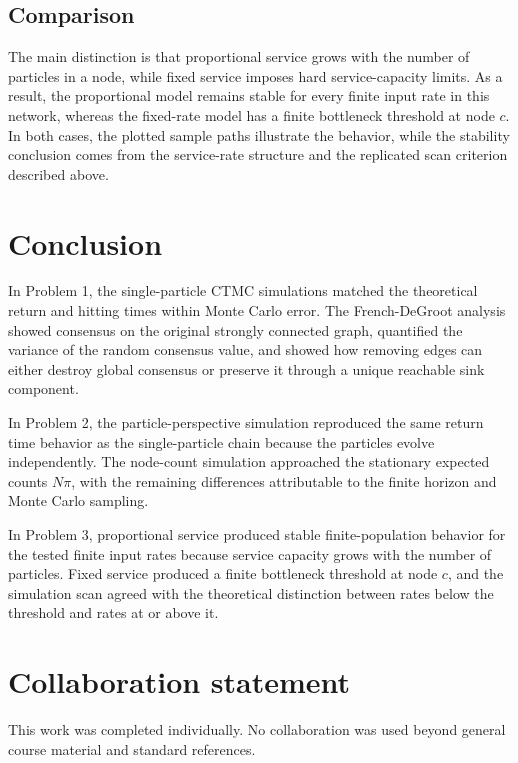 \documentclass[11pt]{article}
\begin{document}
\subsection*{Comparison}

The main distinction is that proportional service grows with the number of
particles in a node, while fixed service imposes hard service-capacity limits.
As a result, the proportional model remains stable for every finite input rate
in this network, whereas the fixed-rate model has a finite bottleneck
threshold at node $c$. In both cases, the plotted sample paths illustrate the
behavior, while the stability conclusion comes from the service-rate structure
and the replicated scan criterion described above.

\section{Conclusion}

In Problem 1, the single-particle CTMC simulations matched the theoretical
return and hitting times within Monte Carlo error. The French-DeGroot analysis
showed consensus on the original strongly connected graph, quantified the
variance of the random consensus value, and showed how removing edges can
either destroy global consensus or preserve it through a unique reachable sink
component.

In Problem 2, the particle-perspective simulation reproduced the same return
time behavior as the single-particle chain because the particles evolve
independently. The node-count simulation approached the stationary expected
counts $N\pi$, with the remaining differences attributable to the finite
horizon and Monte Carlo sampling.

In Problem 3, proportional service produced stable finite-population behavior
for the tested finite input rates because service capacity grows with the
number of particles. Fixed service produced a finite bottleneck threshold at
node $c$, and the simulation scan agreed with the theoretical distinction
between rates below the threshold and rates at or above it.

\section{Collaboration statement}

This work was completed individually. No collaboration was used beyond general
course material and standard references.
\end{document}

